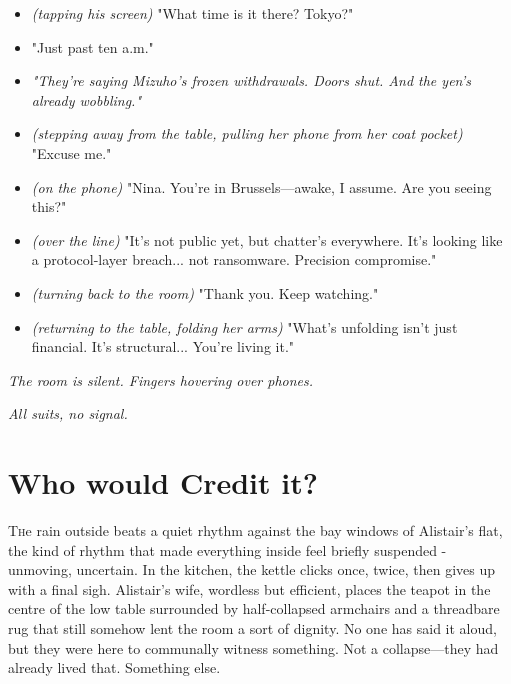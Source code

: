 \begin{itemize}[leftmargin=1.5cm]

\item[Investor \#1:] \textit{(tapping his screen)} "What time is it there? Tokyo?"

\item[Investor \#2:] "Just past ten a.m."

\item[Investor \#3:] \textit{"They're saying Mizuho's frozen withdrawals. Doors shut. And the yen's already wobbling."}

\item[Eleanor:] \textit{(stepping away from the table, pulling her phone from her coat pocket)} "Excuse me."

\item[Eleanor:] \textit{(on the phone)} "Nina. You're in Brussels—awake, I assume. Are you seeing this?"

\item[Nina:] \textit{(over the line)} "It's not public yet, but chatter’s everywhere. It’s looking like a protocol-layer breach... not ransomware. Precision compromise."

\item[Eleanor:] \textit{(turning back to the room)} "Thank you. Keep watching."

\item[Eleanor:] \textit{(returning to the table, folding her arms)} "What’s unfolding isn’t just financial. It's structural... You’re living it."

\end{itemize}

\noindent \textit{The room is silent. Fingers hovering over phones.}

\noindent \textit{All suits, no signal.}


\newpage

\section*{Who would Credit it?}

\lettrine{T}he rain outside beats a quiet rhythm against the bay windows of Alistair's flat, the kind of rhythm that made everything inside feel briefly suspended - unmoving, uncertain. In the kitchen, the kettle clicks once, twice, then gives up with a final sigh. Alistair’s wife, wordless but efficient, places the teapot in the centre of the low table surrounded by half-collapsed armchairs and a threadbare rug that still somehow lent the room a sort of dignity. No one has said it aloud, but they were here to communally witness something. Not a collapse—they had already lived that. Something else.



